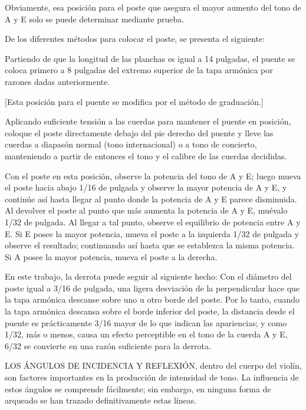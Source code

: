 \documentclass[12pt]{book}
\begin{document}
Obviamente, esa posición para el poste que asegura el mayor aumento del tono de A y E solo se puede determinar mediante prueba.

De los diferentes métodos para colocar el poste, se presenta el siguiente:

Partiendo de que la longitud de las planchas es igual a 14 pulgadas, el puente se coloca primero a 8 pulgadas del extremo superior de la tapa armónica por razones dadas anteriormente.

[Esta posición para el puente se modifica por el método de graduación.]

Aplicando suficiente tensión a las cuerdas para mantener el puente en posición, coloque el poste directamente debajo del pie derecho del puente y lleve las cuerdas a diapasón normal (tono internacional) o a tono de concierto, manteniendo a partir de entonces el tono y el calibre de las cuerdas decididas.

Con el poste en esta posición, observe la potencia del tono de A y E; luego mueva el poste hacia abajo 1/16 de pulgada y observe la mayor potencia de A y E, y continúe así hasta llegar al punto donde la potencia de A y E parece disminuida. Al devolver el poste al punto que más aumenta la potencia de A y E, muévalo 1/32 de pulgada.
Al llegar a tal punto, observe el equilibrio de potencia entre A y E. Si E posee la mayor potencia, mueva el poste a la izquierda 1/32 de pulgada y observe el resultado; continuando así hasta que se establezca la misma potencia. Si A posee la mayor potencia, mueva el poste a la derecha.

En este trabajo, la derrota puede seguir al siguiente hecho: Con el diámetro del poste igual a 3/16 de pulgada, una ligera desviación de la perpendicular hace que la tapa armónica descanse sobre uno u otro borde del poste. Por lo tanto, cuando la tapa armónica descansa sobre el borde inferior del poste, la distancia desde el puente es prácticamente 3/16 mayor de lo que indican las apariencias; y como 1/32, más o menos, causa un efecto perceptible en el tono de la cuerda A y E, 6/32 se convierte en una razón suficiente para la derrota.

LOS ÁNGULOS DE INCIDENCIA Y REFLEXIÓN, dentro del cuerpo del violín, son factores importantes en la producción de intensidad de tono. La influencia de estos ángulos se comprende fácilmente; sin embargo, en ninguna forma de arqueado se han trazado definitivamente estas líneas.
\end{document}
